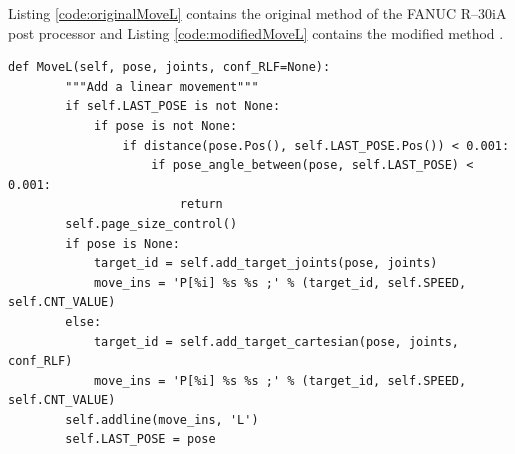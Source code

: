  Listing \ref{code:originalMoveL} contains the original  method of the FANUC R--30iA post processor and Listing \ref{code:modifiedMoveL} contains the modified  method \cite{postmethods}. 


\begin{lstlisting}[numbers=none,caption={Code snippet of original MoveL method},captionpos=b,label={code:originalMoveL}]
    def MoveL(self, pose, joints, conf_RLF=None):
        """Add a linear movement"""
        if self.LAST_POSE is not None:
            if pose is not None:
                if distance(pose.Pos(), self.LAST_POSE.Pos()) < 0.001:
                    if pose_angle_between(pose, self.LAST_POSE) < 0.001:
                        return
        self.page_size_control()
        if pose is None:
            target_id = self.add_target_joints(pose, joints)
            move_ins = 'P[%i] %s %s ;' % (target_id, self.SPEED, self.CNT_VALUE)
        else:
            target_id = self.add_target_cartesian(pose, joints, conf_RLF)
            move_ins = 'P[%i] %s %s ;' % (target_id, self.SPEED, self.CNT_VALUE)
        self.addline(move_ins, 'L')
        self.LAST_POSE = pose


\end{lstlisting}



